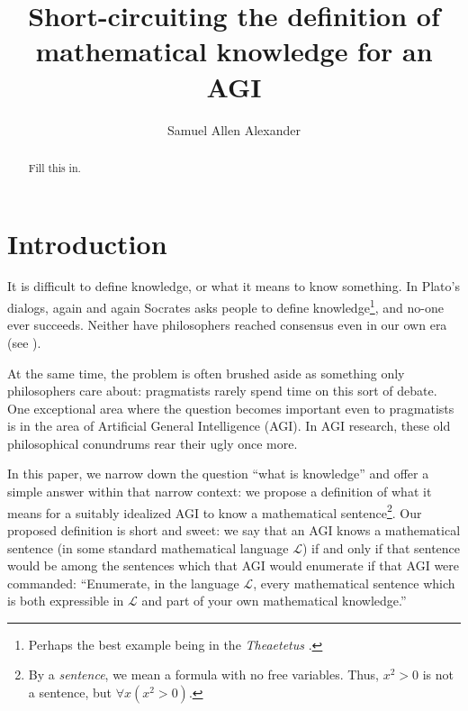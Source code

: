 \documentclass[runningheads]{llncs}
\begin{document}
\title{Short-circuiting the definition of mathematical knowledge for an AGI
}


\author{Samuel Allen
Alexander}



\maketitle

\begin{abstract}
Fill this in.
\end{abstract}

\section{Introduction}

It is difficult to define knowledge, or what it means to know something.
In Plato's dialogs, again and again Socrates asks people to define
knowledge\footnote{Perhaps the best example being in the \emph{Theaetetus}
\cite{theaetetus}.}, and no-one ever succeeds. Neither have philosophers
reached consensus even in our own era (see \cite{sep-knowledge-analysis}).

At the same time, the problem is often brushed aside as something only
philosophers care about: pragmatists rarely spend time
on this sort of debate. One exceptional area where the question becomes
important even to pragmatists is in the area of Artificial General Intelligence
(AGI). In AGI research, these old philosophical conundrums rear their ugly
once more.

In this paper, we narrow down the question ``what is knowledge'' and offer
a simple answer within that narrow context:
we propose a definition of what it means for a suitably idealized AGI to know
a mathematical sentence\footnote{By a \emph{sentence}, we mean a formula with
no free variables. Thus, $x^2>0$ is not a sentence, but
$\forall x (x^2>0)$.}. Our proposed definition is short and
sweet: we say that
an AGI knows a mathematical sentence (in some standard mathematical language $\mathscr L$)
if and only if that sentence would be among the sentences which that AGI would
enumerate if that AGI were commanded:
``Enumerate, in the language $\mathscr L$, every mathematical sentence which
is both expressible in $\mathscr L$ and part of your own mathematical knowledge.''
\end{document}

